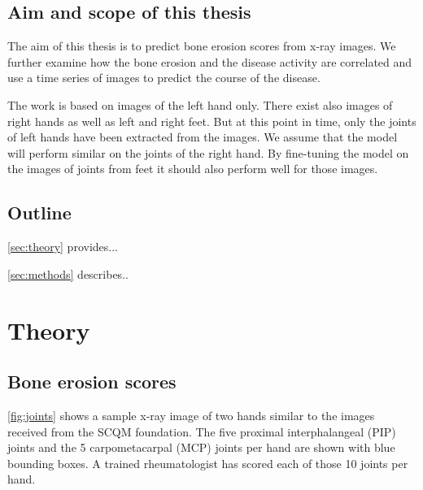 \documentclass[12pt]{article}
\begin{document}



\subsection{Aim and scope of this thesis}

The aim of this thesis is to predict bone erosion scores from x-ray images. We further examine how the bone erosion and the disease activity are correlated and use a time series of images to predict the course of the disease.

The work is based on images of the left hand only. There exist also images of right hands as well as left and right feet. But at this point in time, only the joints of left hands have been extracted from the images. We assume that the model will perform similar on the joints of the right hand. By fine-tuning the model on the images of joints from feet it should also perform well for those images.



\subsection{Outline}

\autoref{sec:theory} provides...

\noindent\autoref{sec:methods} describes..



\newpage

\section{Theory}
\label{sec:theory}

\subsection{Bone erosion scores}
\label{subsec:bone_erosion}

\autoref{fig:joints} shows a sample x-ray image of two hands similar to the images received from the SCQM foundation. The five proximal interphalangeal (PIP) joints and the 5 carpometacarpal (MCP) joints per hand are shown with blue bounding boxes. A trained rheumatologist has scored each of those 10 joints per hand.
\end{document}
